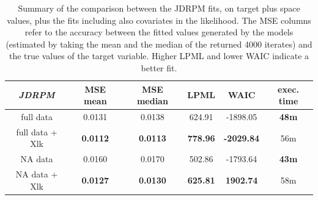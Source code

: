 \documentclass[12pt,	%
	a4paper,		%
	twoside,		%
	openright,		%
	titlepage,%
	]{book}
\theoremstyle{definition}
\begin{document}
\begin{table}[!ht]
    \caption[Accuracy metrics of JDRPM fits, target plus space values, full vs NA dataset, with vs without covariates in the likelihood]{Summary of the comparison between the JDRPM fits, on target plus space values, plus the fits including also covariates in the likelihood. The MSE columns refer to the accuracy between the fitted values generated by the models (estimated by taking the mean and the median of the returned 4000 iterates) and the true values of the target variable. Higher LPML and lower WAIC indicate a better fit.}
    \centering
    \begin{tabular}{cccccc}
    \toprule
           \textit{JDRPM} & MSE mean &  MSE median & LPML & WAIC & exec. time  \\
           \midrule 
        full data & 0.0131  & 0.0138   & 624.91 & -1898.05  &  \textbf{48m} \\
        full data + Xlk & \textbf{0.0112}  & \textbf{0.0113}   & \textbf{778.96} & \textbf{-2029.84}  &  56m \\
        \midrule
        NA data & 0.0160 &  0.0170  &  502.86 & -1793.64 & \textbf{43m}\\
        NA data + Xlk & \textbf{0.0127} &  \textbf{0.0130}  & \textbf{625.81 }& \textbf{1902.74} & 58m\\
        \bottomrule
    \end{tabular}
    \label{tab: fits metrics space julias na full xlk}
\end{table}
\end{document}
